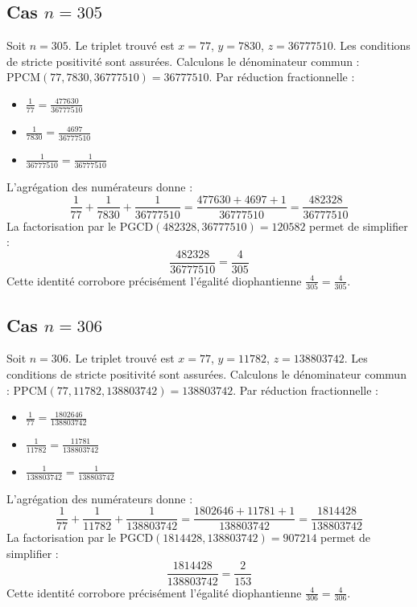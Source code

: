 \documentclass[11pt,a4paper]{article}
\begin{document}
\subsection{Cas $n = 305$}
Soit $n = 305$. Le triplet trouvé est $x = 77$, $y = 7830$, $z = 36777510$.
Les conditions de stricte positivité sont assurées.
Calculons le dénominateur commun : $\text{PPCM}(77, 7830, 36777510) = 36777510$.
Par réduction fractionnelle :
\begin{itemize}
    \item $\frac{1}{77} = \frac{477630}{36777510}$
    \item $\frac{1}{7830} = \frac{4697}{36777510}$
    \item $\frac{1}{36777510} = \frac{1}{36777510}$
\end{itemize}
L'agrégation des numérateurs donne :
$$ \frac{1}{77} + \frac{1}{7830} + \frac{1}{36777510} = \frac{477630 + 4697 + 1}{36777510} = \frac{482328}{36777510} $$
La factorisation par le $\text{PGCD}(482328, 36777510) = 120582$ permet de simplifier :
$$ \frac{482328}{36777510} = \frac{4}{305} $$
Cette identité corrobore précisément l'égalité diophantienne $\frac{4}{305} = \frac{4}{305}$.

\subsection{Cas $n = 306$}
Soit $n = 306$. Le triplet trouvé est $x = 77$, $y = 11782$, $z = 138803742$.
Les conditions de stricte positivité sont assurées.
Calculons le dénominateur commun : $\text{PPCM}(77, 11782, 138803742) = 138803742$.
Par réduction fractionnelle :
\begin{itemize}
    \item $\frac{1}{77} = \frac{1802646}{138803742}$
    \item $\frac{1}{11782} = \frac{11781}{138803742}$
    \item $\frac{1}{138803742} = \frac{1}{138803742}$
\end{itemize}
L'agrégation des numérateurs donne :
$$ \frac{1}{77} + \frac{1}{11782} + \frac{1}{138803742} = \frac{1802646 + 11781 + 1}{138803742} = \frac{1814428}{138803742} $$
La factorisation par le $\text{PGCD}(1814428, 138803742) = 907214$ permet de simplifier :
$$ \frac{1814428}{138803742} = \frac{2}{153} $$
Cette identité corrobore précisément l'égalité diophantienne $\frac{4}{306} = \frac{4}{306}$.
\end{document}
